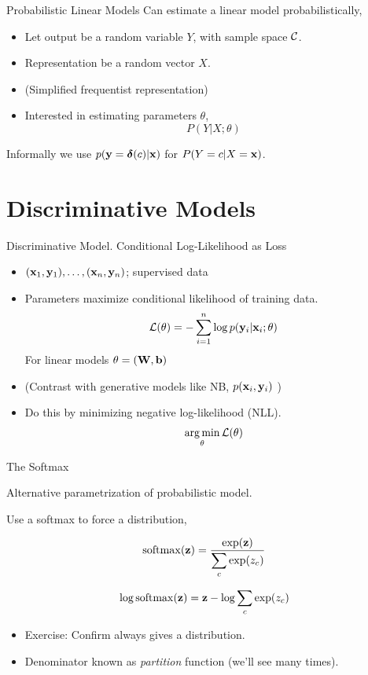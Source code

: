\documentclass{beamer}
\begin{document}
\begin{frame}{Probabilistic Linear Models} 
  Can estimate a linear model probabilistically,

  \begin{itemize}
  \item Let output be a random variable $Y$, with sample space $\mathcal{C}$. 
  \item Representation be a random vector $X$. 
  \item (Simplified frequentist representation)
  \item Interested in estimating parameters $\theta$,
      \[ P(Y | X; \theta) \] 
  \end{itemize}
  Informally we use $p(\mathbf{y}=\boldsymbol{\delta}(c) | \mathbf{x})$ for 
  $P(Y = c | X = \mathbf{x})$.
  
\end{frame}

\section{Discriminative Models}

\begin{frame}{Discriminative Model. Conditional Log-Likelihood as Loss } 
  \begin{itemize}
  \item $(\mathbf{x}_1, \mathbf{y}_1), \ldots, (\mathbf{x}_n, \mathbf{y}_n)$; supervised data
  \item Parameters maximize conditional likelihood of training data.
    \[ \mathcal{L}(\theta) =  - \sum_{i=1}^n \log p(\mathbf{y}_i | \mathbf{x}_i ; \theta) \] 
  For linear models $\theta = (\mathbf{W}, \mathbf{b})$ 
   \item (Contrast with generative models like NB, $p(\mathbf{x}_i, \mathbf{y}_i)$ )
  \item Do this by minimizing negative log-likelihood (NLL).
    \[ \argmin_\theta \mathcal{L}(\theta)\] 
  \end{itemize}
\end{frame}


\begin{frame}{The Softmax}

  Alternative parametrization of probabilistic model.

  
  Use a softmax to force a distribution,
  
  \[\softmax(\boldz) = \frac{\exp(\boldz)}{\displaystyle \sum_{c } \exp(z_c)}  \]

  \[\log \softmax(\boldz) = \boldz - \log \sum_{c} \exp(z_c)  \]


  \begin{itemize}
  \item Exercise: Confirm always gives a distribution.

  \item Denominator known as \textit{partition} function (we'll see many times).
  \end{itemize}

\end{frame}
\end{document}
